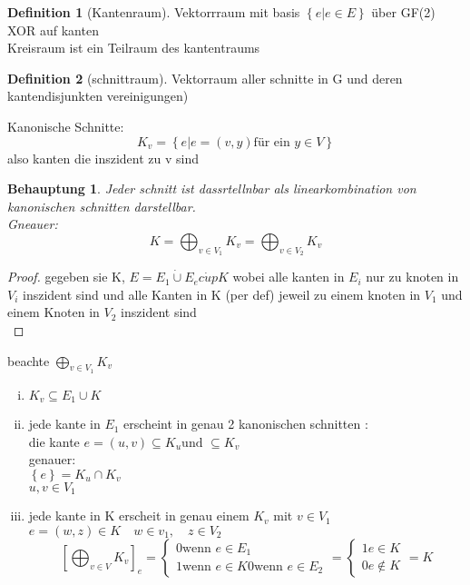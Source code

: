 \documentclass[a4paper]{article}
\newtheorem{behauptung}{Behauptung}
\theoremstyle{definition}
\newtheorem*{definition}{Definition}
\theoremstyle{remark}
\begin{document}
\begin{definition}
  [Kantenraum]
  Vektorrraum mit basis $\left\{ e|e\in E \right\} $ über  GF(2)
  XOR auf kanten\\
  Kreisraum ist ein Teilraum des kantentraums\\
\end{definition}
\begin{definition}
  [schnittraum]
Vektorraum aller schnitte in G und deren kantendisjunkten vereinigungen)
\end{definition}
Kanonische Schnitte: 
\begin{equation*}
  K_v=\left\{ e|e=(v,y) \textrm{für ein  } y \in V \right\}
\end{equation*}
also kanten die inszident zu v sind
\begin{behauptung}
  Jeder schnitt ist dassrtellnbar als linearkombination von kanonischen schnitten  darstellbar. \\
  Gneauer:
  \begin{equation*}
    K=\bigoplus_{v\in V_1}K_v= \bigoplus_{v\in V_2}K_v
  \end{equation*}
\end{behauptung}
\begin{proof}
  gegeben sie K, $ E= E_1\dot{\cup}E_e\dot{cup} K$
wobei alle kanten in $E_i$ nur zu knoten in $V_i$ inszident sind und alle Kanten in K (per def) jeweil zu einem knoten in $V_1$ und einem Knoten in $V_2$ inszident sind\\

\end{proof}
beachte $ \bigoplus_{v\in V_1}K_v$ 
\begin{enumerate}[(i)]
  \item $K_v \subseteq E_1\cup K$
  \item jede kante in $E_1$ erscheint in genau 2 kanonischen schnitten :\\
    die kante  $e=(u,v)\subseteq K_u \textrm{und } \subseteq K_v$\\ genauer:
    \\
    $\left\{ e \right\}= K_u\cap K_v$\\ 
    $u,v\in V_1$
  \item jede kante in K erscheit in genau einem $K_v$ mit $v\in V_1$\\
    $e=(w,z)\in K \quad w\in v_1, \quad z\in V_2$
    \begin{equation*}
      \left[ \bigoplus_{v\in V}K_v \right]_e= 
      \begin{cases}
        0 \textrm{wenn } e\in E_1\\
	1 \textrm{wenn }e\in K
	0 \textrm{wenn }e \in E_2
      \end{cases}
      = 
      \begin{cases}
        1 e \in   K\\
	0 e\notin K
      \end{cases}
      = K
    \end{equation*}
\end{enumerate}
\end{document}

